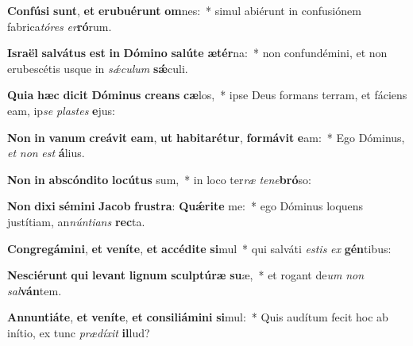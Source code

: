 \item \textbf{Con}\textbf{fú}\textbf{si} \textbf{sunt}, \textbf{et} \textbf{e}\textbf{ru}\textbf{bu}\textbf{é}\textbf{runt} \textbf{om}nes:~* simul abiérunt in confusiónem fabrica\textit{tó}\textit{res} \textit{er}\textbf{ró}rum.
\item \textbf{Is}\textbf{ra}\textbf{ël} \textbf{sal}\textbf{vá}\textbf{tus} \textbf{est} \textbf{in} \textbf{Dó}\textbf{mi}\textbf{no} \textbf{sa}\textbf{lú}\textbf{te} \textbf{æ}\textbf{tér}na:~* non confundémini, et non erubescétis usque in \textit{sǽ}\textit{cu}\textit{lum} \textbf{sǽ}culi.
\item \textbf{Qui}\textbf{a} \textbf{hæc} \textbf{di}\textbf{cit} \textbf{Dó}\textbf{mi}\textbf{nus} \textbf{cre}\textbf{ans} \textbf{cæ}los,~* ipse Deus formans terram, et fáciens eam, ip\textit{se} \textit{plas}\textit{tes} \textbf{e}jus:
\item \textbf{Non} \textbf{in} \textbf{va}\textbf{num} \textbf{cre}\textbf{á}\textbf{vit} \textbf{e}\textbf{am}, \textbf{ut} \textbf{ha}\textbf{bi}\textbf{ta}\textbf{ré}\textbf{tur}, \textbf{for}\textbf{má}\textbf{vit} \textbf{e}am:~* Ego Dóminus, \textit{et} \textit{non} \textit{est} \textbf{á}lius.
\item \textbf{Non} \textbf{in} \textbf{abs}\textbf{cón}\textbf{di}\textbf{to} \textbf{lo}\textbf{cú}\textbf{tus} sum,~* in loco ter\textit{ræ} \textit{te}\textit{ne}\textbf{bró}so:
\item \textbf{Non} \textbf{di}\textbf{xi} \textbf{sé}\textbf{mi}\textbf{ni} \textbf{Ja}\textbf{cob} \textbf{frus}\textbf{tra}: \textbf{Quǽ}\textbf{ri}\textbf{te} me:~* ego Dóminus loquens justítiam, an\textit{nún}\textit{ti}\textit{ans} \textbf{rec}ta.
\item \textbf{Con}\textbf{gre}\textbf{gá}\textbf{mi}\textbf{ni}, \textbf{et} \textbf{ve}\textbf{ní}\textbf{te}, \textbf{et} \textbf{ac}\textbf{cé}\textbf{di}\textbf{te} \textbf{si}mul~* qui salváti \textit{es}\textit{tis} \textit{ex} \textbf{gén}tibus:
\item \textbf{Ne}\textbf{sci}\textbf{é}\textbf{runt} \textbf{qui} \textbf{le}\textbf{vant} \textbf{li}\textbf{gnum} \textbf{sculp}\textbf{tú}\textbf{ræ} \textbf{su}æ,~* et rogant de\textit{um} \textit{non} \textit{sal}\textbf{ván}tem.
\item \textbf{An}\textbf{nun}\textbf{ti}\textbf{á}\textbf{te}, \textbf{et} \textbf{ve}\textbf{ní}\textbf{te}, \textbf{et} \textbf{con}\textbf{si}\textbf{li}\textbf{á}\textbf{mi}\textbf{ni} \textbf{si}mul:~* Quis audítum fecit hoc ab inítio, ex tunc \textit{præ}\textit{dí}\textit{xit} \textbf{il}lud?
